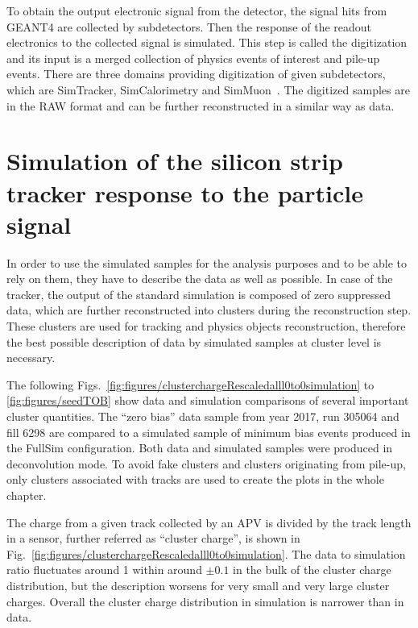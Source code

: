 To obtain the output electronic signal from the detector, the signal hits from GEANT4 are collected by subdetectors. Then the response of the readout electronics to the collected signal is simulated. This step is called the digitization and its input is a merged collection of physics events of interest and pile-up events. There are three domains providing digitization of given subdetectors, which are SimTracker, SimCalorimetry and SimMuon~\cite{website:simdigi}. The digitized samples are in the RAW format and can be further reconstructed in a similar way as data.

\newpage

\section{Simulation of the silicon strip tracker response to the particle signal~\label{sec:trackerSimu}}

In order to use the simulated samples for the analysis purposes and to be able to rely on them, they have to describe the data as well as possible. In case of the tracker, the output of the standard simulation is composed of zero suppressed data, which are further reconstructed into clusters during the reconstruction step. These clusters are used for tracking and physics objects reconstruction, therefore the best possible description of data by simulated samples at cluster level is necessary.

The following Figs.~\ref{fig:figures/clusterchargeRescaledalll0to0simulation} to \ref{fig:figures/seedTOB} show data and simulation comparisons of several important cluster quantities. The ``zero bias'' data sample from year 2017, run 305064 and fill 6298 are compared to a simulated sample of minimum bias events produced in the FullSim configuration. Both data and simulated samples were produced in deconvolution mode. To avoid fake clusters and clusters originating from pile-up, only clusters associated with tracks are used to create the plots in the whole chapter.
 
The charge from a given track collected by an APV is divided by the track length in a sensor, further referred as ``cluster charge'', is shown in Fig.~\ref{fig:figures/clusterchargeRescaledalll0to0simulation}. The data to simulation ratio fluctuates around 1 within around $\pm 0.1$ in the bulk of the cluster charge distribution, but the description worsens for very small and very large cluster charges. Overall the cluster charge distribution in simulation is narrower than in data. 


